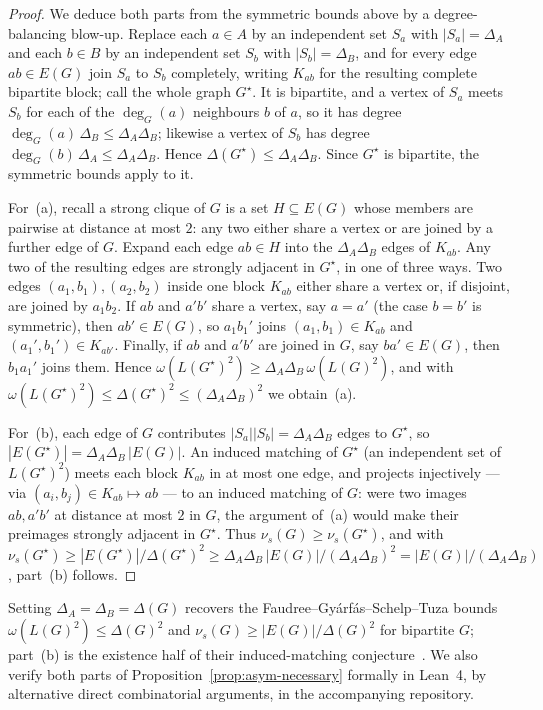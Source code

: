 \documentclass[11pt,a4paper]{article}
\theoremstyle{definition}
\theoremstyle{remark}
\begin{document}
\begin{proof}
We deduce both parts from the symmetric bounds above by a
degree-balancing blow-up. Replace each $a \in A$ by an independent set
$S_a$ with $|S_a| = \Delta_A$ and each $b \in B$ by an independent set
$S_b$ with $|S_b| = \Delta_B$, and for every edge $ab \in E(G)$ join
$S_a$ to $S_b$ completely, writing $K_{ab}$ for the resulting complete
bipartite block; call the whole graph $G^\star$. It is bipartite, and a
vertex of $S_a$ meets $S_b$ for each of the $\deg_G(a)$ neighbours $b$ of
$a$, so it has degree $\deg_G(a)\,\Delta_B \leq \Delta_A\Delta_B$;
likewise a vertex of $S_b$ has degree
$\deg_G(b)\,\Delta_A \leq \Delta_A\Delta_B$. Hence
$\Delta(G^\star) \leq \Delta_A\Delta_B$. Since $G^\star$ is bipartite,
the symmetric bounds apply to it.

For~(a), recall a strong clique of $G$ is a set $H \subseteq E(G)$ whose
members are pairwise at distance at most $2$: any two either share a
vertex or are joined by a further edge of $G$. Expand each edge $ab \in
H$ into the $\Delta_A\Delta_B$ edges of $K_{ab}$. Any two of the
resulting edges are strongly adjacent in $G^\star$, in one of three ways.
Two edges $(a_1, b_1), (a_2, b_2)$ inside one block $K_{ab}$ either share
a vertex or, if disjoint, are joined by $a_1 b_2$. If $ab$ and $a'b'$
share a vertex, say $a = a'$ (the case $b = b'$ is symmetric), then
$ab' \in E(G)$, so $a_1 b_1'$ joins $(a_1, b_1) \in K_{ab}$ and
$(a_1', b_1') \in K_{ab'}$. Finally, if $ab$ and $a'b'$ are joined in $G$,
say $ba' \in E(G)$, then $b_1 a_1'$ joins them. Hence
$\omega(L(G^\star)^2) \geq \Delta_A\Delta_B\,\omega(L(G)^2)$, and with
$\omega(L(G^\star)^2) \leq \Delta(G^\star)^2 \leq (\Delta_A\Delta_B)^2$
we obtain~(a).

For~(b), each edge of $G$ contributes $|S_a||S_b| = \Delta_A\Delta_B$
edges to $G^\star$, so $|E(G^\star)| = \Delta_A\Delta_B\,|E(G)|$. An
induced matching of $G^\star$ (an independent set of $L(G^\star)^2$)
meets each block $K_{ab}$ in at most one edge, and projects
injectively --- via $(a_i, b_j) \in K_{ab} \mapsto ab$ --- to an induced
matching of $G$: were two images $ab, a'b'$ at distance at most $2$ in
$G$, the argument of~(a) would make their preimages strongly adjacent in
$G^\star$. Thus $\nu_s(G) \geq \nu_s(G^\star)$, and with
$\nu_s(G^\star) \geq |E(G^\star)|/\Delta(G^\star)^2 \geq
\Delta_A\Delta_B\,|E(G)|/(\Delta_A\Delta_B)^2 = |E(G)|/(\Delta_A\Delta_B)$,
part~(b) follows.
\end{proof}

Setting $\Delta_A = \Delta_B = \Delta(G)$ recovers the
Faudree--Gy\'arf\'as--Schelp--Tuza
bounds~\cite{faudreeStrongChromaticIndex1990}
$\omega(L(G)^2) \leq \Delta(G)^2$ and
$\nu_s(G) \geq |E(G)|/\Delta(G)^2$ for bipartite $G$; part~(b) is the
existence half of their induced-matching
conjecture~\cite{faudreeInducedMatchingsBipartite1989}. We also verify
both parts of Proposition~\ref{prop:asym-necessary} formally in Lean~4,
by alternative direct combinatorial arguments, in the accompanying
repository.
\end{document}
